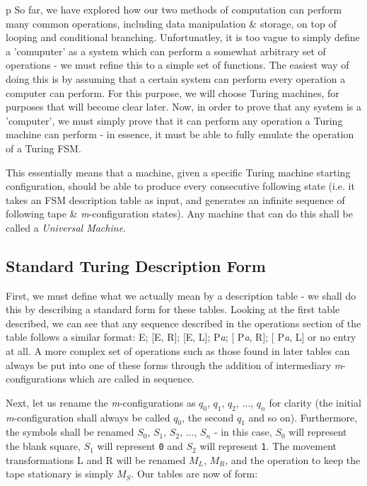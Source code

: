 \documentclass[Master.tex]{subfiles}
\begin{document}
\renewcommand{\arraystretch}{1.5}p
So far, we have explored how our two methods of computation can perform many common operations, including data manipulation \& storage, on top of looping and conditional branching. Unfortunatley, it is too vague to simply define a 'comuputer' as a system which can perform a somewhat arbitrary set of operations - we must refine this to a simple set of functions. The easiest way of doing this is by assuming that a certain system can perform every operation a computer can perform. For this purpose, we will choose Turing machines, for purposes that will become clear later. Now, in order to prove that any system is a 'computer', we must simply prove that it can perform any operation a Turing machine can perform - in essence, it must be able to fully emulate the operation of a Turing FSM. 

 This essentially means that a machine, given a specific Turing machine starting configuration, should be able to produce every consecutive following state (i.e. it takes an FSM description table as input, and generates an infinite sequence of following tape \& \textit{m}-configuration states). Any machine that can do this shall be called a \textit{Universal Machine}.

\subsection{Standard Turing Description Form}

First, we must define what we actually mean by a description table - we shall do this by describing a standard form for these tables. Looking at the first table described, we can see that any sequence described in the operations section of the table follows a similar format: E; [E, R]; [E, L]; P\textit{a}; [ P\textit{a}, R]; [ P\textit{a}, L] or no entry at all. A more complex set of operations such as those found in later tables can always be put into one of these forms through the addition of intermediary \textit{m}-configurations which are called in sequence.

Next, let us rename the \textit{m}-configurations as $q_0$, $q_1$, $q_2$, $...$, $q_n$ for clarity (the initial \textit{m}-configuration shall always be called $q_0$, the second $q_1$ and so on). Furthermore, the symbols shall be renamed $S_0$, $S_1$, $S_2$, $...$, $S_n$ - in this case, $S_0$ will represent the blank square, $S_1$ will represent \texttt{0} and $S_2$ will represent \texttt{1}. The movement transformations L and R will be renamed $M_L$, $M_R$, and the operation to keep the tape stationary is simply $M_S$. Our tables are now of form:
\end{document}
